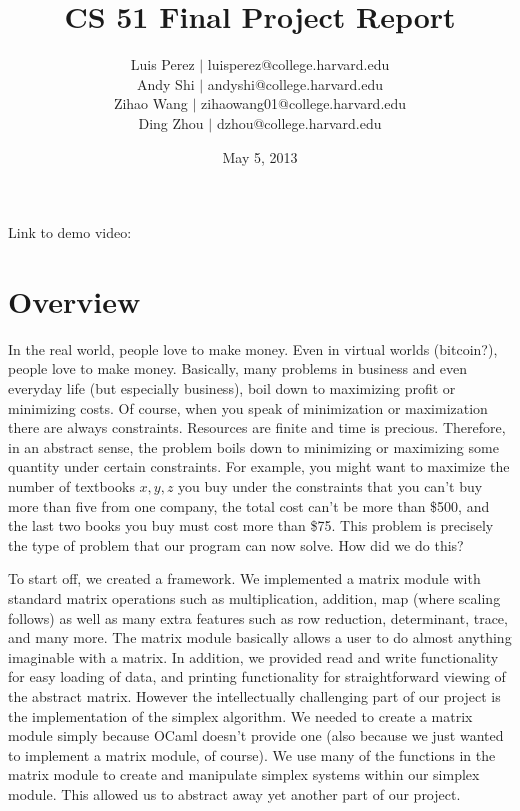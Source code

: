 \documentclass[letterpaper,12pt]{article}
\begin{document}
\title{CS 51 Final Project Report}
\author{
Luis Perez $|$ luisperez@college.harvard.edu \\ 
Andy Shi $|$ andyshi@college.harvard.edu \\ 
Zihao Wang $|$ zihaowang01@college.harvard.edu \\ 
Ding Zhou $|$ dzhou@college.harvard.edu
}
\date{May 5, 2013}
\maketitle

Link to demo video: \url{}

\section{Overview}

In the real world, people love to make money. Even in virtual worlds (bitcoin?),
people love to make money. Basically, many problems in business and even
everyday life (but especially business), boil down to maximizing profit or
minimizing costs. Of course, when you speak of minimization or maximization
there are always constraints. Resources are finite and time is precious.
Therefore, in an abstract sense, the problem boils down to minimizing or
maximizing some quantity under certain constraints. For example, you might want
to maximize the number of textbooks $x,y,z$ you buy under the constraints that you
can't buy more than five from one company, the total cost can't be more
than \$500, and the last two books you buy must cost more than \$75. This problem
is precisely the type of problem that our program can now solve. How did we do
this?

To start off, we created a framework. We implemented a matrix module with
standard matrix operations such as multiplication, addition, map (where scaling
follows) as well as many extra features such as row reduction, determinant,
trace, and many more. The matrix module basically allows a user to do almost
anything imaginable with a matrix. In addition, we provided read and write
functionality for easy loading of data, and printing functionality for
straightforward viewing of the abstract matrix. However the intellectually
challenging part of our project is the implementation of the simplex algorithm.
We needed to create a matrix module simply because OCaml doesn't provide one
(also because we just wanted to implement a matrix module, of course). We use
many of the functions in the matrix module to create and manipulate simplex
systems within our simplex module. This allowed us to abstract away yet another
part of our project.
\end{document}
